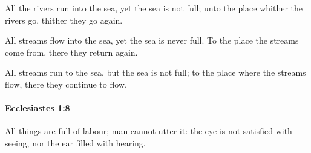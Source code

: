 			\begin{versebox}
					\item[BHS] 
					\item[LXX] 
					\item[ASV] All the rivers run into the sea, yet the sea is not full; unto the place whither the rivers go, thither they go again.
					\item[NIV] All streams flow into the sea, yet the sea is never full. To the place the streams come from, there they return again.
					\item[NRSV] All streams run to the sea, but the sea is not full; to the place where the streams flow, there they continue to flow.
			\end{versebox}

		\paragraph{Ecclesiastes 1:8} %
			\label{ECCLESIASTES-1-8}

			All things are full of labour; man cannot utter it: the eye is not satisfied with seeing, nor the ear filled with hearing.

